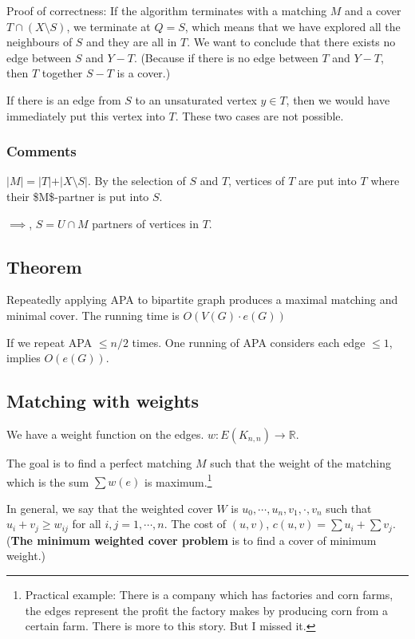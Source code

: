 \documentclass[11pt]{article}
\def\R{\mathbb{R}}
\begin{document}
Proof of correctness: If the algorithm terminates with a matching \(M\) and a
cover \(T \cap (X \setminus S)\), we terminate at \(Q = S\), which means that we
have explored all the neighbours of \(S\) and they are all in \(T\). We want to
conclude that there exists no edge between \(S\) and \(Y-T\). (Because if there
is no edge between \(T\) and \(Y-T\), then \(T\) together \(S-T\) is a cover.)

If there is an edge from \(S\) to an unsaturated vertex \(y \in T\), then we
would have immediately put this vertex into \(T\). These two cases are not
possible.
\subsubsection{Comments}
\label{sec:orgc25e5e6}
\(\vert M \vert = \vert T \vert + \vert X \setminus S\vert\). By the selection
of \(S\) and \(T\), vertices of \(T\) are put into \(T\) where their \$M\$-partner is
put into \(S\).

\(\implies\), \(S = U \cap M\) partners of vertices in \(T\).
\subsection{Theorem}
\label{sec:orgec326c7}
Repeatedly applying APA to bipartite graph produces a maximal matching and
minimal cover. The running time is \(O(V(G) \cdot e(G))\)

If we repeat APA \(\le n/2\) times. One running of APA considers each edge
\(\le 1\), implies \(O(e(G))\).
\subsection{Matching with weights}
\label{sec:orgad39d6e}
We have a weight function on the edges. \(w\colon E(K_{n, n}) \rightarrow \R\).

The goal is to find a perfect matching \(M\) such that the weight of the
matching which is the sum \(\sum w(e)\) is maximum.\footnote{Practical example: There is a company which has factories and corn
farms, the edges represent the profit the factory makes by producing corn from a
certain farm. There is more to this story. But I missed it.}

In general, we say that the weighted cover \(W\) is \(u_0, \cdots, u_n, v_1,
   \cdot, v_n\) such that \(u_i+v_j \ge w_{ij}\) for all \(i, j = 1, \cdots, n\). The
cost of \((u, v)\), \(c(u, v) = \sum u_i + \sum v_j\). (\textbf{The minimum weighted
cover problem} is to find a cover of minimum weight.)
\end{document}
